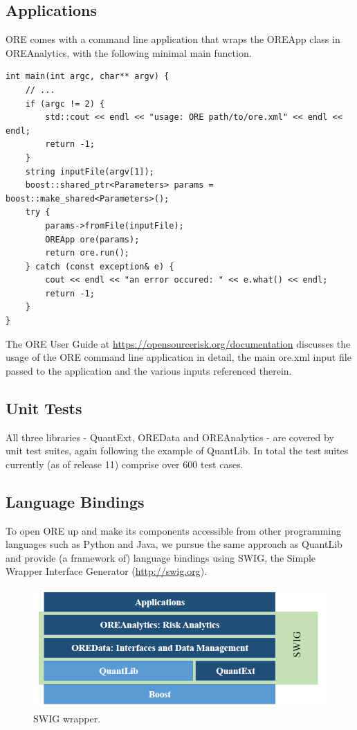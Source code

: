 \documentclass[12pt, a4paper]{report}
\begin{document}
\subsection*{Applications}
ORE comes with a command line application that wraps the OREApp class in OREAnalytics, with the following minimal main function.

\begin{listing}[H]
\begin{verbatim}
int main(int argc, char** argv) {
	// ...
	if (argc != 2) {
		std::cout << endl << "usage: ORE path/to/ore.xml" << endl << endl;
		return -1;
	}
	string inputFile(argv[1]);
	boost::shared_ptr<Parameters> params = boost::make_shared<Parameters>();
	try {
		params->fromFile(inputFile);
		OREApp ore(params);
		return ore.run();
	} catch (const exception& e) {
		cout << endl << "an error occured: " << e.what() << endl;
		return -1;
	}
}
\end{verbatim}
\end{listing}

The ORE User Guide at \url{https://opensourcerisk.org/documentation} discusses the usage of the ORE command line application in detail, the main ore.xml input file passed to the application and the various inputs referenced therein.

\subsection*{Unit Tests}
All three libraries - QuantExt, OREData and OREAnalytics - are covered by unit test suites, again following the example of QuantLib. In total the test suites currently (as of release 11) comprise over 600 test cases.

\subsection*{Language Bindings}
To open ORE up and make its components accessible from other programming languages such as Python and Java, we pursue the same approach as QuantLib and provide (a framework of) language bindings using SWIG, the Simple Wrapper
Interface Generator (\url{http://swig.org}).

\begin{figure}[h]
\begin{center}
\includegraphics[scale=0.6]{data/OverviewSWIG}
\end{center}
\caption{SWIG wrapper. }
\label{fig_SWIG}
\end{figure}
\end{document}
